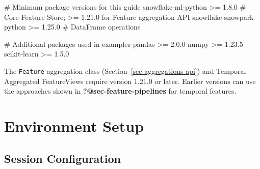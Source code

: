 \documentclass[
  letterpaper,
  DIV=11,
  numbers=noendperiod]{scrreprt}
\newenvironment{Shaded}{\begin{snugshade}}{\end{snugshade}}
\newcommand{\CommentTok}[1]{\textcolor[rgb]{0.37,0.37,0.37}{#1}}
\newcommand{\FloatTok}[1]{\textcolor[rgb]{0.68,0.00,0.00}{#1}}
\newcommand{\NormalTok}[1]{\textcolor[rgb]{0.00,0.23,0.31}{#1}}
\newcommand{\OperatorTok}[1]{\textcolor[rgb]{0.37,0.37,0.37}{#1}}
\begin{document}
\begin{Shaded}
\begin{Highlighting}[]
\CommentTok{\# Minimum package versions for this guide}
\NormalTok{snowflake}\OperatorTok{{-}}\NormalTok{ml}\OperatorTok{{-}}\NormalTok{python }\OperatorTok{\textgreater{}=} \FloatTok{1.8.0}      \CommentTok{\# Core Feature Store; \textgreater{}= 1.21.0 for Feature aggregation API}
\NormalTok{snowflake}\OperatorTok{{-}}\NormalTok{snowpark}\OperatorTok{{-}}\NormalTok{python }\OperatorTok{\textgreater{}=} \FloatTok{1.25.0}  \CommentTok{\# DataFrame operations}

\CommentTok{\# Additional packages used in examples}
\NormalTok{pandas }\OperatorTok{\textgreater{}=} \FloatTok{2.0.0}
\NormalTok{numpy }\OperatorTok{\textgreater{}=} \FloatTok{1.23.5}
\NormalTok{scikit}\OperatorTok{{-}}\NormalTok{learn }\OperatorTok{\textgreater{}=} \FloatTok{1.5.0}
\end{Highlighting}
\end{Shaded}

\begin{tcolorbox}[enhanced jigsaw, title=\textcolor{quarto-callout-note-color}{\faInfo}\hspace{0.5em}{🆕 New Features in snowflake-ml 1.21+}, colbacktitle=quarto-callout-note-color!10!white, rightrule=.15mm, arc=.35mm, colframe=quarto-callout-note-color-frame, left=2mm, bottomtitle=1mm, toptitle=1mm, breakable, bottomrule=.15mm, opacityback=0, titlerule=0mm, toprule=.15mm, opacitybacktitle=0.6, colback=white, coltitle=black, leftrule=.75mm]

The \texttt{Feature} aggregation class
(Section~\ref{sec-aggregations-api}) and Temporal Aggregated
FeatureViews require version 1.21.0 or later. Earlier versions can use
the approaches shown in \textbf{?@sec-feature-pipelines} for temporal
features.

\end{tcolorbox}

\hypertarget{environment-setup}{%
\section{Environment Setup}\label{environment-setup}}

\hypertarget{session-configuration}{%
\subsection{Session Configuration}\label{session-configuration}}
\end{document}
